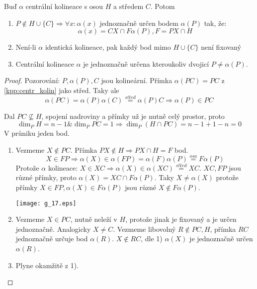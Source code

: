 \begin{lemma}\label{kpp:centr_kolin_prop}
    Buď $\alpha$ centrální kolineace s osou $H$ a středem $C$. Potom
    \begin{enumerate}
        \item $P\not\in H\cup\{C\}\Rightarrow \forall x: \alpha(x)$ jednoznačně určen bodem $\alpha(P)$ tak, že:
		\[ \alpha(x)=CX\cap F\alpha(P), F=PX\cap H \]
        \item Není-li $\alpha$ identická kolineace, pak každý bod mimo $H\cup \{C\}$ není fixovaný
        \item Centrální kolineace $\alpha$ je jednoznačně určena kteroukoliv dvojicí $P\neq\alpha(P)$.
    \end{enumerate}
\end{lemma}
\begin{proof}
	Pozorování: $P, \alpha(P), C$ jsou kolineární.
	Přímka $\alpha(PC) = PC$ z \cref{kpp:centr_kolin} jako střed.
	Taky ale
	\[ \alpha(PC) = \alpha(P)\alpha(C) \stackrel{střed}{=} \alpha(P) C \Rightarrow \alpha(P) \in PC \]

	Dal $PC \nsubseteq H$, spojení nadroviny a přímky už je nutně celý prostor, proto
	\[ \dim_P H = n - 1 \& \dim_P PC = 1 \Rightarrow \dim_P (H \cap PC) = n - 1 + 1 - n = 0 \]
	V průniku jeden bod.

    \begin{enumerate}
	    \item Vezmeme $X \notin PC$.
		    Přímka $PX \notin H \Rightarrow PX \cap H = F$ bod.
		    \[ X \in FP \Rightarrow \alpha(X) \in \alpha(FP) = \alpha(F)\alpha(P) \stackrel{osa}{=} F\alpha(P) \]
		    Protože $\alpha$ kolineace: $X \in XC \Rightarrow \alpha(X) \in \alpha(XC) \stackrel{střed}{=} XC$.
		    $XC, FP$ jsou různé přímky, proto $\alpha(X) = XC \cap F\alpha(P)$.
		    Taky $X \ne \alpha(X)$ protože přímky $X \in FP, \alpha(X) \in F\alpha(P)$ jsou různé $X \notin F\alpha(P)$.

    	\texttt{[image: g\_17.eps]}
\item Vezmeme $X \in PC$, nutně neleží v $H$, protože jinak je fixovaný a je určen jednoznačně.
	Analogicky $X \ne C$.
	Vezmeme libovolný $R \notin PC, H$, přímka $RC$ jednoznačně určuje bod $\alpha(R)$.
	$X \notin RC$, dle 1) $\alpha(X)$ je jednoznačně určen $\alpha(R)$.

	\item Plyne okamžitě z 1).
    \end{enumerate}
\end{proof}

